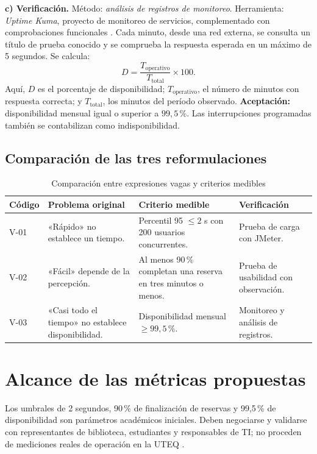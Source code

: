 \documentclass[conference,onecolumn]{IEEEtran}
\begin{document}
\textbf{c) Verificación.} Método: \emph{análisis de registros de monitoreo}. Herramienta: \emph{Uptime Kuma}, proyecto de monitoreo de servicios, complementado con comprobaciones funcionales \cite{uptimekuma}. Cada minuto, desde una red externa, se consulta un título de prueba conocido y se comprueba la respuesta esperada en un máximo de 5 segundos. Se calcula:
\begin{equation}
D=\frac{T_{\mathrm{operativo}}}{T_{\mathrm{total}}}\times 100.
\label{eq:disponibilidad}
\end{equation}
Aquí, $D$ es el porcentaje de disponibilidad; $T_{\mathrm{operativo}}$, el número de minutos con respuesta correcta; y $T_{\mathrm{total}}$, los minutos del período observado. \textbf{Aceptación:} disponibilidad mensual igual o superior a $99{,}5\,\%$. Las interrupciones programadas también se contabilizan como indisponibilidad.

\subsection{Comparación de las tres reformulaciones}
\begin{table}[H]
\caption{Comparación entre expresiones vagas y criterios medibles}
\label{tab:comparacion}
\centering\footnotesize
\begin{tabularx}{\textwidth}{@{}p{}p{}Yp{0.24\textwidth}@{}}
\toprule
\textbf{Código} & \textbf{Problema original} & \textbf{Criterio medible} & \textbf{Verificación}\\
\midrule
V-01 & «Rápido» no establece un tiempo. & Percentil 95 $\leq 2$ s con 200 usuarios concurrentes. & Prueba de carga con JMeter.\\
V-02 & «Fácil» depende de la percepción. & Al menos 90\,\% completan una reserva en tres minutos o menos. & Prueba de usabilidad con observación.\\
V-03 & «Casi todo el tiempo» no establece disponibilidad. & Disponibilidad mensual $\geq 99{,}5\,\%$. & Monitoreo y análisis de registros.\\
\bottomrule
\end{tabularx}
\end{table}

\section{Alcance de las métricas propuestas}
Los umbrales de 2 segundos, 90\,\% de finalización de reservas y 99,5\,\% de disponibilidad son parámetros académicos iniciales. Deben negociarse y validarse con representantes de biblioteca, estudiantes y responsables de TI; no proceden de mediciones reales de operación en la UTEQ \cite{ieee29148,iso25010}.
\end{document}
